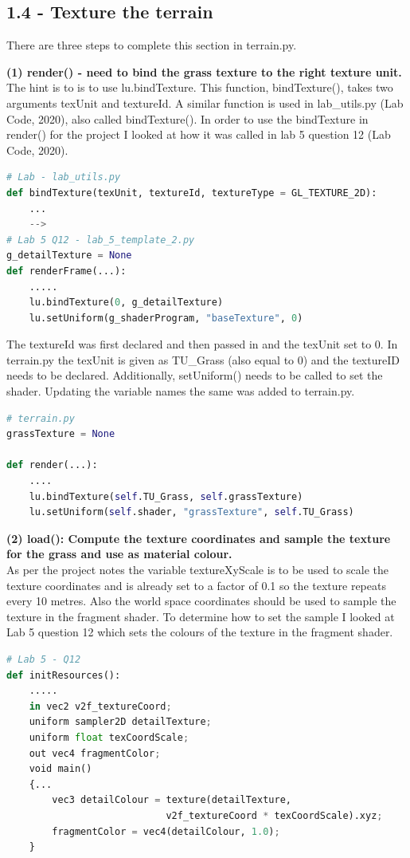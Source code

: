 \documentclass[a4 paper, 12pt]{article}
\begin{document}
\subsection{1.4 - Texture the terrain}
There are three steps to complete this section in terrain.py. 

\textbf{(1) render() - need to bind the grass texture to the right texture unit.} \\ 
The hint is to is to use lu.bindTexture. This function, bindTexture(), takes two arguments texUnit and textureId. A similar function is used in lab\_utils.py (Lab Code, 2020), also called bindTexture(). In order to use the bindTexture in render() for the project I looked at how it was called in lab 5 question 12 (Lab Code, 2020).
    
    \begin{lstlisting}[language=python]
# Lab - lab_utils.py 
def bindTexture(texUnit, textureId, textureType = GL_TEXTURE_2D):
    ...
    -->
# Lab 5 Q12 - lab_5_template_2.py
g_detailTexture = None
def renderFrame(...):
    .....
    lu.bindTexture(0, g_detailTexture)
    lu.setUniform(g_shaderProgram, "baseTexture", 0)
    \end{lstlisting}

The textureId was first declared and then passed in and the texUnit set to 0. In terrain.py the texUnit is given as TU\_Grass (also equal to 0) and the textureID needs to be declared. Additionally, setUniform() needs to be called to set the shader. Updating the variable names the same was added to terrain.py.
    \begin{lstlisting}[language=python]       
# terrain.py
grassTexture = None

def render(...):
    ....
    lu.bindTexture(self.TU_Grass, self.grassTexture)
    lu.setUniform(self.shader, "grassTexture", self.TU_Grass)        
    \end{lstlisting}

   
\textbf{(2) load(): Compute the texture coordinates and sample the texture for the grass and use as material colour.} \\
As per the project notes the variable textureXyScale is to be used to scale the texture coordinates and is already set to a factor of 0.1 so the texture repeats every 10 metres. Also the world space coordinates should be used  to sample the texture in the fragment shader. To determine how to set the sample I looked at Lab 5 question 12 which sets the colours of the texture in the fragment shader.
\begin{lstlisting}[language=python] 
# Lab 5 - Q12   
def initResources():
    .....         
    in vec2 v2f_textureCoord;
    uniform sampler2D detailTexture; 
    uniform float texCoordScale; 
    out vec4 fragmentColor;
    void main() 
    {...
        vec3 detailColour = texture(detailTexture, 
                            v2f_textureCoord * texCoordScale).xyz;      
        fragmentColor = vec4(detailColour, 1.0);
    }        
\end{lstlisting}
\end{document}
